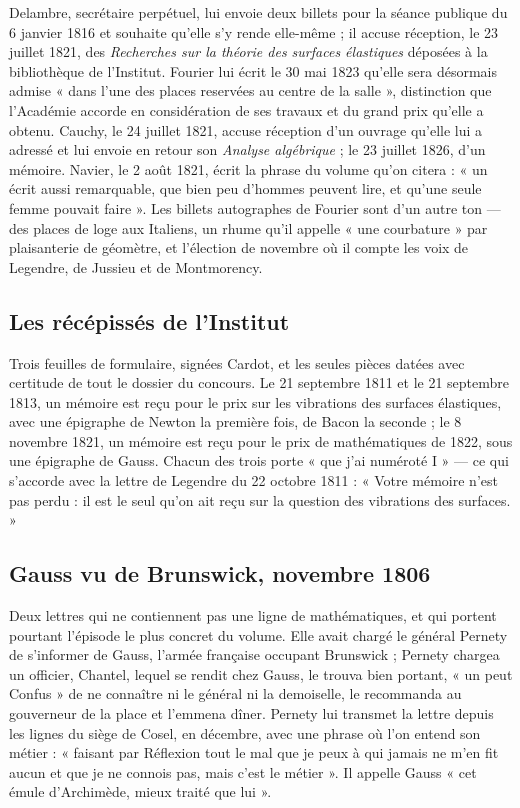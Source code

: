 \documentclass[11pt,a4paper]{article}
\begin{document}
Delambre, secrétaire perpétuel, lui envoie deux billets pour la séance
publique du 6 janvier 1816 et souhaite qu'elle s'y rende elle-même ; il accuse
réception, le 23 juillet 1821, des \emph{Recherches sur la théorie des surfaces
élastiques} déposées à la bibliothèque de l'Institut. Fourier lui écrit le 30
mai 1823 qu'elle sera désormais admise « dans l'une des places reservées au
centre de la salle », distinction que l'Académie accorde en considération de
ses travaux et du grand prix qu'elle a obtenu. Cauchy, le 24 juillet 1821,
accuse réception d'un ouvrage qu'elle lui a adressé et lui envoie en retour son
\emph{Analyse algébrique} ; le 23 juillet 1826, d'un mémoire. Navier, le 2 août 1821, écrit la
phrase du volume qu'on citera : « un écrit aussi remarquable, que bien peu
d'hommes peuvent lire, et qu'une seule femme pouvait faire ». Les billets
autographes de Fourier sont d'un autre ton — des places de loge aux Italiens,
un rhume qu'il appelle « une courbature » par plaisanterie de géomètre, et
l'élection de novembre où il compte les voix de Legendre, de Jussieu et de
Montmorency.

\subsection*{Les récépissés de l'Institut}

Trois feuilles de formulaire, signées Cardot, et les seules pièces datées avec
certitude de tout le dossier du concours. Le 21 septembre 1811 et le 21
septembre 1813, un mémoire est reçu pour le prix sur les vibrations des
surfaces élastiques, avec une épigraphe de Newton la première fois, de Bacon
la seconde ; le 8 novembre 1821, un mémoire est reçu pour le prix de
mathématiques de 1822, sous une épigraphe de Gauss. Chacun des trois porte
« que j'ai numéroté I » — ce qui s'accorde avec la lettre de Legendre du 22
octobre 1811 : « Votre mémoire n'est pas perdu : il est le seul qu'on ait reçu
sur la question des vibrations des surfaces. »

\subsection*{Gauss vu de Brunswick, novembre 1806}

Deux lettres qui ne contiennent pas une ligne de mathématiques, et qui portent
pourtant l'épisode le plus concret du volume. Elle avait chargé le général
Pernety de s'informer de Gauss, l'armée française occupant Brunswick ; Pernety
chargea un officier, Chantel, lequel se rendit chez Gauss, le trouva bien portant, « un
peut Confus » de ne connaître ni le général ni la demoiselle, le recommanda au
gouverneur de la place et l'emmena dîner. Pernety lui transmet la lettre
depuis les lignes du siège de Cosel, en décembre, avec une phrase où l'on
entend son métier : « faisant par Réflexion tout le mal que je peux à qui
jamais ne m'en fit aucun et que je ne connois pas, mais c'est le métier ». Il
appelle Gauss « cet émule d'Archimède, mieux traité que lui ».
\end{document}

